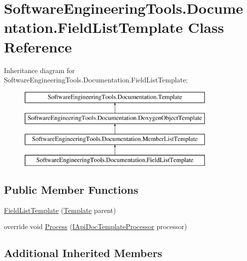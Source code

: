 \hypertarget{class_software_engineering_tools_1_1_documentation_1_1_field_list_template}{\section{Software\+Engineering\+Tools.\+Documentation.\+Field\+List\+Template Class Reference}
\label{class_software_engineering_tools_1_1_documentation_1_1_field_list_template}
}
Inheritance diagram for Software\+Engineering\+Tools.\+Documentation.\+Field\+List\+Template\+:\begin{figure}[H]
\begin{center}
\leavevmode
\includegraphics[height=4.000000cm]{class_software_engineering_tools_1_1_documentation_1_1_field_list_template}
\end{center}
\end{figure}
\subsection*{Public Member Functions}
\begin{DoxyCompactItemize}
\item 
\hyperlink{class_software_engineering_tools_1_1_documentation_1_1_field_list_template_a87bf6479af861358b746e2c0bbed7289}{Field\+List\+Template} (\hyperlink{class_software_engineering_tools_1_1_documentation_1_1_template}{Template} parent)
\item 
override void \hyperlink{class_software_engineering_tools_1_1_documentation_1_1_field_list_template_ac0967577c807c358f3a2bdcab2570f72}{Process} (\hyperlink{interface_software_engineering_tools_1_1_documentation_1_1_i_api_doc_template_processor}{I\+Api\+Doc\+Template\+Processor} processor)
\end{DoxyCompactItemize}
\subsection*{Additional Inherited Members}


